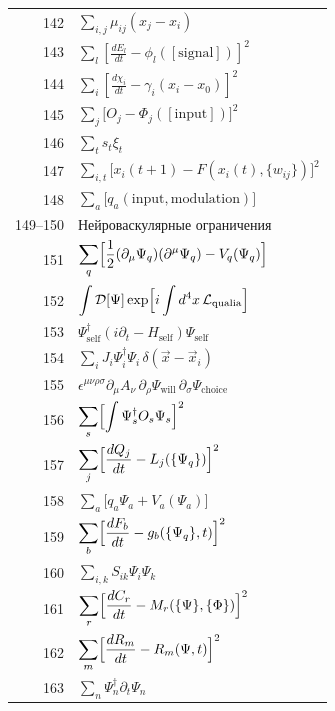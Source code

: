 \documentclass[12pt,a4paper]{article}
\begin{document}
\begin{longtable}{r p{}}
		142 & \(\displaystyle \sum_{i,j}\mu_{ij}(x_j - x_i)\) \\
		143 & \(\displaystyle \sum_l\left[\frac{dE_l}{dt} - \phi_l([\text{signal}])\right]^2\) \\
		144 & \(\displaystyle \sum_i\left[\frac{d\chi_i}{dt} - \gamma_i(x_i - x_0)\right]^2\) \\
		145 & \(\displaystyle \sum_j\bigl[O_j - \Phi_j([\text{input}])\bigr]^2\) \\
		146 & \(\displaystyle \sum_t s_t\xi_t\) \\
		147 & \(\displaystyle \sum_{i,t}\bigl[x_i(t+1) - F(x_i(t),\{w_{ij}\})\bigr]^2\) \\
		148 & \(\displaystyle \sum_a\bigl[q_a(\text{input},\text{modulation})\bigr]\) \\
		149–150 & Нейроваскулярные ограничения \\
		151 & \(\displaystyle \sum_q\Bigl[\frac12(\partial_\mu\Psi_q)(\partial^\mu\Psi_q) - V_q(\Psi_q)\Bigr]\) \\
		152 & \(\displaystyle \int\mathcal{D}[\Psi]\exp\Bigl[i\int d^4x\,\mathcal{L}_{\text{qualia}}\Bigr]\) \\
		153 & \(\displaystyle \Psi^\dagger_{\text{self}}(i\partial_t - H_{\text{self}})\Psi_{\text{self}}\) \\
		154 & \(\displaystyle \sum_i J_i\Psi^\dagger_i\Psi_i\,\delta(\vec x - \vec x_i)\) \\
		155 & \(\displaystyle \epsilon^{\mu\nu\rho\sigma}\partial_\mu A_\nu\,\partial_\rho\Psi_{\text{will}}\,\partial_\sigma\Psi_{\text{choice}}\) \\
		156 & \(\displaystyle \sum_s\Bigl[\int\Psi^\dagger_s O_s\Psi_s\Bigr]^2\) \\
		157 & \(\displaystyle \sum_j\Bigl[\frac{dQ_j}{dt} - L_j(\{\Psi_q\})\Bigr]^2\) \\
		158 & \(\displaystyle \sum_a\bigl[q_a\Psi_a + V_a(\Psi_a)\bigr]\) \\
		159 & \(\displaystyle \sum_b\Bigl[\frac{dF_b}{dt} - g_b(\{\Psi_q\},t)\Bigr]^2\) \\
		160 & \(\displaystyle \sum_{i,k}S_{ik}\Psi_i\Psi_k\) \\
		161 & \(\displaystyle \sum_r\Bigl[\frac{dC_r}{dt} - M_r(\{\Psi\},\{\Phi\})\Bigr]^2\) \\
		162 & \(\displaystyle \sum_m\Bigl[\frac{dR_m}{dt} - R_m(\Psi,t)\Bigr]^2\) \\
		163 & \(\displaystyle \sum_n\Psi^\dagger_n\partial_t\Psi_n\) \\

\end{longtable}
\end{document}
